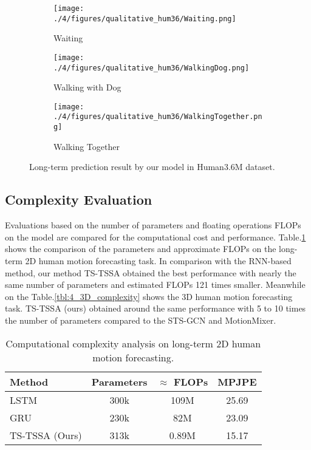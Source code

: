 \begin{figure}
     \centering
     \begin{subfigure}{0.45\textwidth}
         \centering
         \texttt{[image: ./4/figures/qualitative\_hum36/Waiting.png]}
         \caption{Waiting}
         \label{fig:3d_long_waiting}
     \end{subfigure}
     \begin{subfigure}{0.45\textwidth}
         \centering
         \texttt{[image: ./4/figures/qualitative\_hum36/WalkingDog.png]}
         \caption{Walking with Dog}
         \label{fig:3d_long_walkingdog}
     \end{subfigure}
     
     \begin{subfigure}{0.45\textwidth}
         \centering
         \texttt{[image: ./4/figures/qualitative\_hum36/WalkingTogether.png]}
         \caption{Walking Together}
         \label{fig:3d_long_walkingtogether}
     \end{subfigure}
     
     \caption{Long-term prediction result by our model in Human3.6M dataset.}
     \label{fig:3D_long_qual_3}
\end{figure}

\subsection{Complexity Evaluation}
Evaluations based on the number of parameters and floating operations FLOPs on the model are compared for the computational cost and performance. Table.\ref{tbl:4_2D_complexity} shows the comparison of the parameters and approximate FLOPs on the long-term 2D human motion forecasting task. In comparison with the RNN-based method, our method TS-TSSA obtained the best performance with nearly the same number of parameters and estimated FLOPs 121 times smaller. Meanwhile on the Table.\ref{tbl:4_3D_complexity} shows the 3D human motion forecasting task. TS-TSSA (ours) obtained around the same performance with 5 to 10 times the number of parameters compared to the STS-GCN\cite{Sofianos2021} and MotionMixer\cite{motionmixer2022}.

\begin{table}[!t]
    \centering
    \caption{Computational complexity analysis on long-term 2D human motion forecasting.}
        \begin{tabular}{l|ccc}
        \toprule
           Method  & Parameters & $\approx$ FLOPs & MPJPE \\
        \midrule
            LSTM & 300k & 109M & 25.69 \\
            GRU & 230k & 82M & 23.09 \\
            TS-TSSA (Ours) & 313k & 0.89M & 15.17 \\
        \midrule
    
        \end{tabular} 
    \label{tbl:4_2D_complexity}
\end{table}


